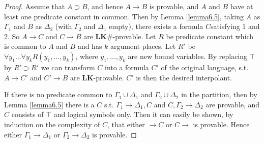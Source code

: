 \documentclass[11pt]{article}
\def \LK {\textbf{LK}}
\def \LKsh {\textbf{LK\#}}
\begin{document}
\begin{proof}
Assume that \(A\supset B\), and hence \(A\to B\) is provable, and \(A\) and \(B\) have at least
one predicate constant in common. Then by Lemma \ref{lemma6.5}, taking \(A\) as \(\Gamma_1\)
and \(B\) as \(\Delta_2\) (with \(\Gamma_2\) and \(\Delta_1\) empty), there exists a
formula \(C\)satisfying 1 and 2. So \(A\to C\) and \(C\to B\) are \(\LKsh\)-provable. Let \(R\)
be predicate constant which is common to \(A\) and \(B\) and has \(k\) argument places.
Let \(R'\) be \(\forall y_1\dots\forall y_kR(y_1,\dots,y_k)\), where \(y_1,\dots,y_k\) are new bound
variables.  By replacing \(\top\) by \(R'\supset R'\) we can transform \(C\) into a
formula \(C'\) of the original language, s.t. \(A\to C'\) and \(C'\to B\)
are \(\LK\)-provable. \(C'\) is then the desired interpolant.

If there is no predicate common to \(\Gamma_1\cup\Delta_1\) and \(\Gamma_2\cup\Delta_2\) in the
partition, then by Lemma \ref{lemma6.5} there is a \(C\) s.t. \(\Gamma_1\to\Delta_1,C\)
and \(C,\Gamma_2\to\Delta_2\) are provable, and \(C\) consists of \(\top\) and logical symbols
only. Then it can easily be shown, by induction on the complexity of \(C\), that either \(\to C\)
or \(C\to\) is provable. Hence either \(\Gamma_1\to\Delta_1\) or \(\Gamma_2\to\Delta_2\) is provable.
\end{proof}
\end{document}
